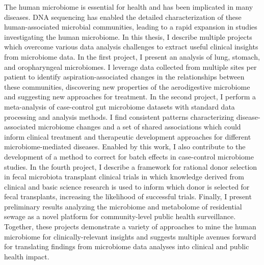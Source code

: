 
The human microbiome is essential for health and has been implicated in many diseases.
DNA sequencing has enabled the detailed characterization of these human-associated microbial communities, leading to a rapid expansion in studies investigating the human microbiome.
In this thesis, I describe multiple projects which overcome various data analysis challenges to extract useful clinical insights from microbiome data.
In the first project, I present an analysis of lung, stomach, and oropharyngeal microbiomes.
I leverage data collected from multiple sites per patient to identify aspiration-associated changes in the relationships between these communities, discovering new properties of the aerodigestive microbiome and suggesting new approaches for treatment.
In the second project, I perform a meta-analysis of case-control gut microbiome datasets with standard data processing and analysis methods.
I find consistent patterns characterizing disease-associated microbiome changes and a set of shared associations which could inform clinical treatment and therapeutic development approaches for different microbiome-mediated diseases.
Enabled by this work, I also contribute to the development of a method to correct for batch effects in case-control microbiome studies.
In the fourth project, I describe a framework for rational donor selection in fecal microbiota transplant clinical trials in which knowledge derived from clinical and basic science research is used to inform which donor is selected for fecal transplants, increasing the likelihood of successful trials.
Finally, I present preliminary results analyzing the microbiome and metabolome of residential sewage as a novel platform for community-level public health surveillance.
Together, these projects demonstrate a variety of approaches to mine the human microbiome for clinically-relevant insights and suggests multiple avenues forward for translating findings from microbiome data analyses into clinical and public health impact.
